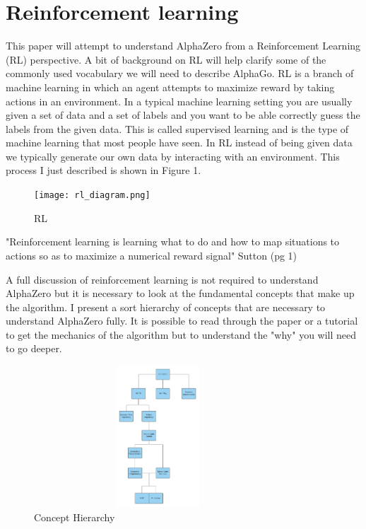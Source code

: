 \section{Reinforcement learning}

This paper will attempt to understand AlphaZero from a Reinforcement Learning (RL) perspective. A bit of background on RL will help clarify some of the commonly used vocabulary we will need to describe AlphaGo. RL is a branch of machine learning in which an agent attempts to maximize reward by taking actions in an environment. In a typical machine learning setting you are usually given a set of data and a set of labels and you want to be able correctly guess the labels from the given data. This is called supervised learning and is the type of machine learning that most people have seen. In RL instead of being given data we typically generate our own data by interacting with an environment. This process I just described is shown in Figure 1. 

    \begin{figure}[H]
        \centering
        \texttt{[image: rl\_diagram.png]}
        \caption{RL}
        \label{fig:my_label}
    \end{figure}


"Reinforcement learning is learning what to do and how to map situations to actions so as to maximize a numerical reward signal" Sutton (pg 1)

A full discussion of reinforcement learning is not required to understand AlphaZero but it is necessary to look at the fundamental concepts that make up the algorithm. I present a sort hierarchy of concepts that are necessary to understand AlphaZero fully. It is possible to read through the paper or a tutorial to get the mechanics of the algorithm but to understand the "why" you will need to go deeper. 

    \begin{figure}[H]
        \centering
        \includegraphics[width=350px,height=200px]{images/alphazero_concepts.png}
        \caption{Concept Hierarchy}
        \label{fig:my_label}
    \end{figure}


